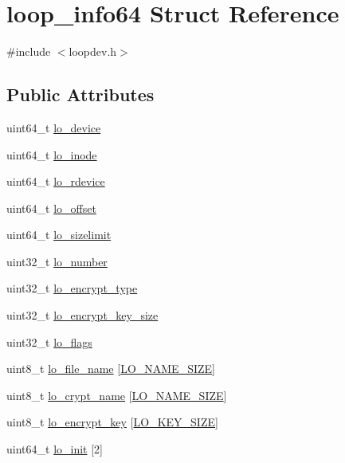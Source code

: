 \hypertarget{structloop__info64}{}\section{loop\+\_\+info64 Struct Reference}
\label{structloop__info64}


{\ttfamily \#include $<$loopdev.\+h$>$}

\subsection*{Public Attributes}
\begin{DoxyCompactItemize}
\item 
uint64\+\_\+t \hyperlink{structloop__info64_ae1242f25b3f46d24ef41f537e3e5c24c}{lo\+\_\+device}
\item 
uint64\+\_\+t \hyperlink{structloop__info64_a2441331a60e2cf13835c52634ecb12ab}{lo\+\_\+inode}
\item 
uint64\+\_\+t \hyperlink{structloop__info64_acf9b8410370967aceef642e07cf5d649}{lo\+\_\+rdevice}
\item 
uint64\+\_\+t \hyperlink{structloop__info64_acbe88b7d8532c1474fd28ce7f4578341}{lo\+\_\+offset}
\item 
uint64\+\_\+t \hyperlink{structloop__info64_a76c586564a87c69df033701afa1723ce}{lo\+\_\+sizelimit}
\item 
uint32\+\_\+t \hyperlink{structloop__info64_a2d0faef6ae3f5ff25168a34ca74cd0a1}{lo\+\_\+number}
\item 
uint32\+\_\+t \hyperlink{structloop__info64_a531c5f1de9ee89232813283562cb9947}{lo\+\_\+encrypt\+\_\+type}
\item 
uint32\+\_\+t \hyperlink{structloop__info64_a4d68a022fd912f70dc5ee5c373be58fd}{lo\+\_\+encrypt\+\_\+key\+\_\+size}
\item 
uint32\+\_\+t \hyperlink{structloop__info64_a490278ca648aa0d114880e75dabad4c8}{lo\+\_\+flags}
\item 
uint8\+\_\+t \hyperlink{structloop__info64_a8ed7981af3ea18e93d3cd40702a1cd1f}{lo\+\_\+file\+\_\+name} \mbox{[}\hyperlink{loopdev_8h_a37ee3183824e653a26b90f59ac3cc311}{L\+O\+\_\+\+N\+A\+M\+E\+\_\+\+S\+I\+ZE}\mbox{]}
\item 
uint8\+\_\+t \hyperlink{structloop__info64_aff2f95f2ab2df109fe3b03fbd323e5c5}{lo\+\_\+crypt\+\_\+name} \mbox{[}\hyperlink{loopdev_8h_a37ee3183824e653a26b90f59ac3cc311}{L\+O\+\_\+\+N\+A\+M\+E\+\_\+\+S\+I\+ZE}\mbox{]}
\item 
uint8\+\_\+t \hyperlink{structloop__info64_a31f33a9af4104d3895a005599b70918a}{lo\+\_\+encrypt\+\_\+key} \mbox{[}\hyperlink{loopdev_8h_a0e1c16cccb21fe5ee20f91b5f468c0b7}{L\+O\+\_\+\+K\+E\+Y\+\_\+\+S\+I\+ZE}\mbox{]}
\item 
uint64\+\_\+t \hyperlink{structloop__info64_ae73f9915eea2a6c8c01a3a655052ed32}{lo\+\_\+init} \mbox{[}2\mbox{]}
\end{DoxyCompactItemize}


